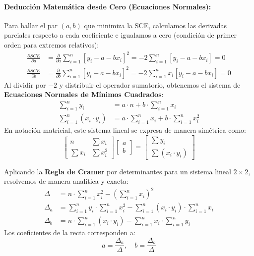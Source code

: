 \documentclass[11pt,letterpaper]{article}
\begin{document}
\paragraph{Deducción Matemática desde Cero (Ecuaciones Normales):}
Para hallar el par $(a,b)$ que minimiza la SCE, calculamos las derivadas parciales respecto a cada coeficiente e igualamos a cero (condición de primer orden para extremos relativos):
\begin{align}
    \frac{\partial SCE}{\partial a} &= \frac{\partial}{\partial a} \sum_{i=1}^n [y_i - a - b x_i]^2 = -2 \sum_{i=1}^n [y_i - a - b x_i] = 0 \\
    \frac{\partial SCE}{\partial b} &= \frac{\partial}{\partial b} \sum_{i=1}^n [y_i - a - b x_i]^2 = -2 \sum_{i=1}^n x_i [y_i - a - b x_i] = 0
\end{align}
Al dividir por $-2$ y distribuir el operador sumatorio, obtenemos el sistema de \textbf{Ecuaciones Normales de Mínimos Cuadrados}:
\begin{align}
    \sum_{i=1}^n y_i &= a \cdot n + b \cdot \sum_{i=1}^n x_i \\
    \sum_{i=1}^n (x_i \cdot y_i) &= a \cdot \sum_{i=1}^n x_i + b \cdot \sum_{i=1}^n x_i^2
\end{align}
En notación matricial, este sistema lineal se expresa de manera simétrica como:
\begin{equation}
    \begin{bmatrix} n & \sum x_i \\ \sum x_i & \sum x_i^2 \end{bmatrix} \begin{bmatrix} a \\ b \end{bmatrix} = \begin{bmatrix} \sum y_i \\ \sum (x_i \cdot y_i) \end{bmatrix}
\end{equation}

Aplicando la \textbf{Regla de Cramer} por determinantes para un sistema lineal $2 \times 2$, resolvemos de manera analítica y exacta:
\begin{align}
    \Delta &= n \cdot \sum_{i=1}^n x_i^2 - \left(\sum_{i=1}^n x_i\right)^2 \\
    \Delta_a &= \sum_{i=1}^n y_i \cdot \sum_{i=1}^n x_i^2 - \sum_{i=1}^n (x_i \cdot y_i) \cdot \sum_{i=1}^n x_i \\
    \Delta_b &= n \cdot \sum_{i=1}^n (x_i \cdot y_i) - \sum_{i=1}^n x_i \cdot \sum_{i=1}^n y_i
\end{align}
Los coeficientes de la recta corresponden a:
\begin{equation}
    a = \frac{\Delta_a}{\Delta}, \quad b = \frac{\Delta_b}{\Delta}
\end{equation}
\end{document}

